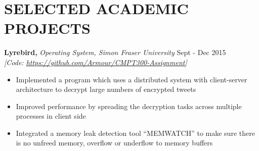 \documentclass[11pt]{article} %
\begin{document}
\section{SELECTED ACADEMIC PROJECTS}

\hspace{6mm}\textbf{Lyrebird,} \textit{Operating System, Simon Fraser University} \hfill Sept - Dec 2015\\
\vspace{1mm}
\hspace{6mm}\textit{[Code: \underline{\href{https://github.com/Armour/CMPT300-Assignment}{https://github.com/Armour/CMPT300-Assignment}}]}
\begin{itemize}[leftmargin=16mm]
        \item Implemented a program which uses a distributed system with client-server architecture to decrypt large numbers of encrypted tweets 
		\vspace{-2mm}
        \item Improved performance by spreading the decryption tasks across multiple processes in client side
		\vspace{-2mm} 
        \item Integrated a memory leak detection tool ``MEMWATCH'' to make sure there is no unfreed memory, overflow or underflow to memory buffers
\end{itemize}

\vspace{1mm}
\end{document}

